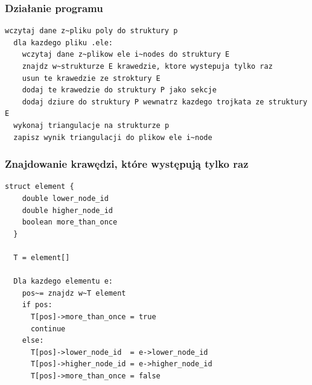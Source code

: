 \documentclass[a4paper]{article}
\begin{document}
\subsubsection{Działanie programu}
\begin{lstlisting}[caption=Przykładowe wywołanie]
  wczytaj dane z~pliku poly do struktury p
  dla kazdego pliku .ele:
    wczytaj dane z~plikow ele i~nodes do struktury E
    znajdz w~strukturze E krawedzie, ktore wystepuja tylko raz
    usun te krawedzie ze stroktury E
    dodaj te krawedzie do struktury P jako sekcje
    dodaj dziure do struktury P wewnatrz kazdego trojkata ze struktury E
  wykonaj triangulacje na strukturze p
  zapisz wynik triangulacji do plikow ele i~node
\end{lstlisting}

\subsubsection{Znajdowanie krawędzi, które występują tylko raz}
\begin{lstlisting}[caption=Przykładowe wywołanie]
  struct element {
    double lower_node_id
    double higher_node_id
    boolean more_than_once
  }

  T = element[]

  Dla kazdego elementu e:
    pos~= znajdz w~T element
    if pos:
      T[pos]->more_than_once = true
      continue
    else:
      T[pos]->lower_node_id  = e->lower_node_id
      T[pos]->higher_node_id = e->higher_node_id
      T[pos]->more_than_once = false
\end{lstlisting}
\end{document}
